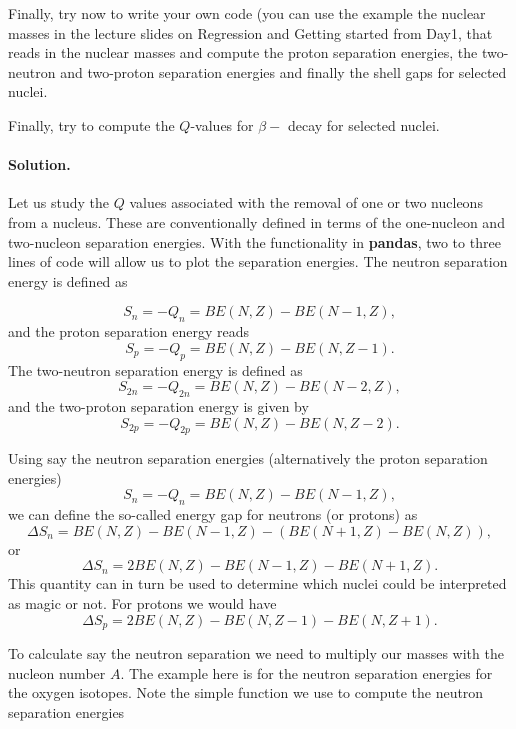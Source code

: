 \documentclass[%
oneside,                 %
final,                   %
10pt]{article}
\newenvironment{doconceexercise}{}{}
\newcounter{doconceexercisecounter}
\begin{document}
\begin{doconceexercise}

                             

Finally, try now to write your own code (you can use the example the nuclear masses in the lecture slides on Regression and Getting started from Day1, that reads in the nuclear masses and
compute the proton separation energies, the two-neutron and two-proton separation energies and finally the shell gaps for selected nuclei.

Finally, try to compute the $Q$-values for $\beta-$ decay for selected nuclei.

\paragraph{Solution.}
Let us study the $Q$ values associated with the removal of one or two nucleons from
a nucleus. These are conventionally defined in terms of the one-nucleon and two-nucleon
separation energies. With the functionality in \textbf{pandas}, two to three lines of code will allow us to plot the separation energies.
The neutron separation energy is defined as 

\[
S_n= -Q_n= BE(N,Z)-BE(N-1,Z),
\]
and the proton separation energy reads
\[
S_p= -Q_p= BE(N,Z)-BE(N,Z-1).
\]
The two-neutron separation energy is defined as
\[
S_{2n}= -Q_{2n}= BE(N,Z)-BE(N-2,Z),
\]
and  the two-proton separation energy is given by
\[
S_{2p}= -Q_{2p}= BE(N,Z)-BE(N,Z-2).
\]

Using say the neutron separation energies (alternatively the proton separation energies)
\[
S_n= -Q_n= BE(N,Z)-BE(N-1,Z),
\]
we can define the so-called energy gap for neutrons (or protons) as 
\[
\Delta S_n= BE(N,Z)-BE(N-1,Z)-\left(BE(N+1,Z)-BE(N,Z)\right),
\]
or 
\[
\Delta S_n= 2BE(N,Z)-BE(N-1,Z)-BE(N+1,Z).
\]
This quantity can in turn be used to determine which nuclei could be interpreted as  magic or not. 
For protons we would have 
\[
\Delta S_p= 2BE(N,Z)-BE(N,Z-1)-BE(N,Z+1).
\]

To calculate say the neutron separation we need to multiply our masses with the nucleon number $A$.
The example here is for the neutron separation energies for the oxygen isotopes.
Note the simple function we use to compute the neutron separation energies








\end{doconceexercise}
\end{document}
